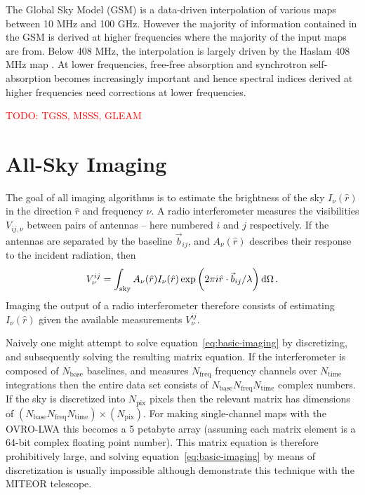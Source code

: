 \documentclass[twocolumn]{aastex6}
\renewcommand{\d}{{\rm d}}
\newcommand{\todo}[1]{\textcolor{red}{TODO: #1}\PackageWarning{TODO:}{#1!}}
\begin{document}
The Global Sky Model (GSM) \citep{2008MNRAS.388..247D, 2017MNRAS.464.3486Z} is a data-driven
interpolation of various maps between 10 MHz and 100 GHz. However the majority of information
contained in the GSM is derived at higher frequencies where the majority of the input maps are from.
Below 408 MHz, the interpolation is largely driven by the Haslam 408 MHz map
\citep{1981A&A...100..209H, 1982A&AS...47....1H}.  At lower frequencies, free-free absorption and
synchrotron self-absorption becomes increasingly important and hence spectral indices derived at
higher frequencies need corrections at lower frequencies.





\citet{2011A&A...525A.138G}


\todo{TGSS, MSSS, GLEAM}



\section{All-Sky Imaging}

The goal of all imaging algorithms is to estimate the brightness of the sky $I_\nu(\hat r)$ in the
direction $\hat r$ and frequency $\nu$. A radio interferometer measures the visibilities
$V_{ij,\nu}$ between pairs of antennas -- here numbered $i$ and $j$ respectively. If the antennas
are separated by the baseline $\vec b_{ij}$, and $A_\nu(\hat r)$ describes their response to the
incident radiation, then
\begin{equation}\label{eq:basic-imaging}
    V^{ij}_\nu = \int_\text{sky}
                 A_\nu(\hat r) I_\nu(\hat r)
                 \exp\bigg(2\pi i \hat r\cdot\vec b_{ij}/\lambda\bigg) \,\d\Omega \, .
\end{equation}
Imaging the output of a radio interferometer therefore consists of estimating $I_\nu(\hat r)$ given
the available measurements $V^{ij}_\nu$.

Naively one might attempt to solve equation~\ref{eq:basic-imaging} by discretizing, and subsequently
solving the resulting matrix equation. If the interferometer is composed of $N_\text{base}$
baselines, and measures $N_\text{freq}$ frequency channels over $N_\text{time}$ integrations then
the entire data set consists of $N_\text{base}N_\text{freq}N_\text{time}$ complex numbers. If the
sky is discretized into $N_\text{pix}$ pixels then the relevant matrix has dimensions of
$(N_\text{base}N_\text{freq}N_\text{time})\times(N_\text{pix})$. For making single-channel maps with
the OVRO-LWA this becomes a 5 petabyte array (assuming each matrix element is a 64-bit complex
floating point number).  This matrix equation is therefore prohibitively large, and solving
equation~\ref{eq:basic-imaging} by means of discretization is usually impossible although
\citet{2017MNRAS.465.2901Z} demonstrate this technique with the MITEOR telescope.
\end{document}
